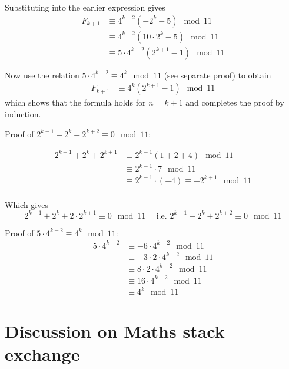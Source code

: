 \documentclass[11pt]{amsart}
\begin{document}
Substituting into the earlier expression gives
$$
\begin{aligned}
F_{k+1} 
&\equiv 
4^{k-2} 
\left(
- 2^{k}  - 5
\right)
\mod 11
\\ &\equiv 
4^{k-2} 
\left(
10 \cdot 2^{k}  - 5
\right)
\mod 11
\\ &\equiv 
5 \cdot 4^{k-2} 
\left(
2^{k+1}  - 1
\right)
\mod 11
\end{aligned}
$$


Now use the relation $5 \cdot 4^{k-2} \equiv 4^{k} \mod 11$ (see separate proof) to obtain
$$
\begin{aligned}
F_{k+1} 
&\equiv 
4^{k} 
\left(
2^{k+1}  - 1
\right)
\mod 11
\end{aligned}
$$
which shows that the formula holds for $n=k+1$ and completes the proof by induction.


\vspace{2em}

Proof of $2^{k-1} + 2^{k} + 2^{k+2} \equiv 0 \mod 11 $:

$$
\begin{aligned}
2^{k-1} + 2^{k} + 2^{k+1} 
& \equiv 
2^{k-1} (1 + 2 + 4) \mod 11
\\
& \equiv 
2^{k-1} \cdot 7 \mod 11
\\
& \equiv 
2^{k-1} \cdot (-4) \equiv - 2^{k+1}\mod 11
\\
\end{aligned}
$$

Which gives 
$$
2^{k-1} + 2^{k} + 2 \cdot 2^{k+1} \equiv 0 \mod 11
\quad \text{ i.e. }
2^{k-1} + 2^{k} + 2^{k+2} \equiv 0 \mod 11
$$



\vspace{2em}

Proof of $5 \cdot 4^{k-2} \equiv 4^{k} \mod 11$:
$$
\begin{aligned}
5 \cdot 4^{k-2} 
& \equiv
- 6 \cdot 4^{k-2} \mod 11
\\
&\equiv
- 3 \cdot 2 \cdot 4^{k-2} \mod 11
\\
&\equiv
8 \cdot 2 \cdot 4^{k-2} \mod 11
\\
&\equiv
16 \cdot 4^{k-2} \mod 11
\\
&\equiv
4^{k} \mod 11
\end{aligned}
$$


\section{Discussion on Maths stack exchange}
\end{document}
